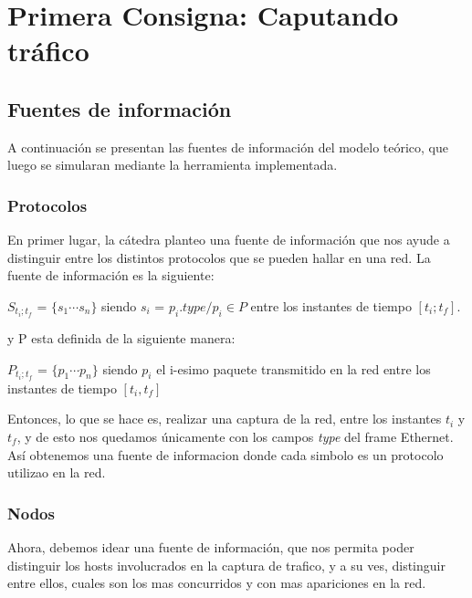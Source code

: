 \section{Primera Consigna: Caputando tr\'afico}\label{sec:metodos_1}

\subsection{Fuentes de información}

A continuación se presentan las fuentes de información del modelo teórico, que luego se simularan mediante la herramienta implementada. 

\subsubsection{Protocolos}

En primer lugar, la cátedra planteo una fuente de información que nos ayude a distinguir entre los distintos protocolos que se pueden hallar en una red. La fuente de información es la siguiente:

\begin{center}
	$S_{t_i;t_f}$ = $\{s_1 \dotsb s_n\}$ siendo $s_i$ = $p_i.type / p_i \in P$ entre los instantes de tiempo $[t_i; t_f ]$.
\end{center}

y P esta definida de la siguiente manera:

\begin{center}
	$P_{t_i;t_f}$ = $\{p_1 \dotsb p_n\}$ siendo $p_i$ el i-esimo paquete transmitido en la red entre los instantes de tiempo $[t_i, t_f]$
\end{center}

Entonces, lo que se hace es, realizar una captura de la red, entre los instantes $t_i$ y $t_f$, y de esto nos quedamos únicamente con los campos \textit{type} del frame Ethernet. Así obtenemos una fuente de informacion donde cada simbolo es un protocolo utilizao en la red.

\subsubsection{Nodos}

Ahora, debemos idear una fuente de información, que nos permita poder distinguir los hosts involucrados en la captura de trafico, y a su ves, distinguir entre ellos, cuales son los mas concurridos y con mas apariciones en la red.\\

